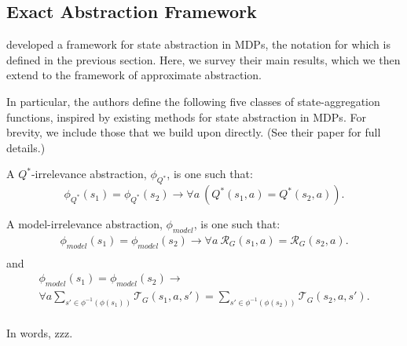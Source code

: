 \subsection{Exact Abstraction Framework}

\citeauthor*{li2006towards} developed a framework for state abstraction in \acp{MDP}, the notation for which is defined in the previous section. Here, we survey their main results, which we then extend to the framework of approximate abstraction.

In particular, the authors define the following five classes of state-aggregation functions, inspired by existing methods for state abstraction in \acp{MDP}. For brevity, we include those that we build upon directly. (See their paper for full details.)

\begin{defn}
A $Q^*$-irrelevance abstraction, $\phi_{Q^*}$, is one such that:
\begin{equation}
\phi_{Q^*}(s_1) = \phi_{Q^*}(s_2) \rightarrow \forall a\ \left(Q^*(s_1,a) = Q^*(s_2,a)\right).
\end{equation}
\end{defn}

\begin{defn}
A model-irrelevance abstraction, $\phi_{model}$, is one such that:
\begin{multline}
\phi_{model}(s_1) = \phi_{model}(s_2) \rightarrow \forall a\ \mathcal{R}_G(s_1,a) = \mathcal{R}_G(s_2,a). \\
\end{multline}
and
\begin{multline}
\phi_{model}(s_1) = \phi_{model}(s_2) \rightarrow \\ \forall a \sum_{s' \in \phi^{-1}(\phi(s_1))} \mathcal{T}_G(s_1,a,s') =\sum_{s' \in \phi^{-1}(\phi(s_2))} \mathcal{T}_G(s_2,a,s'). \\
\end{multline}
\end{defn}

In words, zzz.
